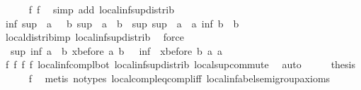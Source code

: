 \begin{isabellebody}
\ \ \ \ \isamarkupfalse%
\ f{}{}\ f{}{}\ \isamarkupfalse%
\ {\isacharparenleft}simp\ add{\isacharcolon}\ local{\isachardot}inf{\isacharunderscore}sup{\isacharunderscore}distrib{}{\isacharparenright}\isanewline
\ \ \isamarkupfalse%
\ {\isachardoublequoteopen}inf\ {\isacharparenleft}sup\ {\isacharparenleft}{\isacharminus}\ a{\isacharparenright}\ {\isacharparenleft}{\isacharminus}\ {\isacharparenleft}{\isacharminus}\ b{\isacharparenright}{\isacharparenright}{\isacharparenright}\ {\isacharparenleft}sup\ {\isacharparenleft}{\isacharminus}\ a{\isacharparenright}\ {\isacharparenleft}{\isacharminus}\ b{\isacharparenright}{\isacharparenright}\ {\isacharequal}\ sup\ {\isacharparenleft}sup\ {\isacharparenleft}{\isacharminus}\ a{\isacharparenright}\ {\isacharparenleft}{\isacharminus}\ a{\isacharparenright}{\isacharparenright}\ {\isacharparenleft}inf\ b\ {\isacharparenleft}{\isacharminus}\ b{\isacharparenright}{\isacharparenright}{\isachardoublequoteclose}\isanewline
\ \ \ \ \isamarkupfalse%
\ local{\isachardot}distrib{\isacharunderscore}imp{}\ local{\isachardot}inf{\isacharunderscore}sup{\isacharunderscore}distrib{}\ \isamarkupfalse%
\ force\isanewline
\ \ \isamarkupfalse%
\ \isamarkupfalse%
\ {\isachardoublequoteopen}{\isacharminus}\ sup\ {\isacharparenleft}inf\ a\ {\isacharparenleft}{\isacharminus}\ b{\isacharparenright}{\isacharparenright}\ {\isacharparenleft}xbefore\ a\ b{\isacharparenright}\ {\isacharequal}\ {\isacharminus}\ inf\ {\isacharparenleft}{\isacharminus}\ xbefore\ b\ a{\isacharparenright}\ a{\isachardoublequoteclose}\isanewline
\ \ \ \ \isamarkupfalse%
\ f{}{}\ f{}{}\ f{}{}\ f{}{}\ local{\isachardot}inf{\isacharunderscore}compl{\isacharunderscore}bot\ local{\isachardot}inf{\isacharunderscore}sup{\isacharunderscore}distrib{}\ local{\isachardot}sup{\isacharunderscore}commute\ \isamarkupfalse%
\ auto\isanewline
\ \ \isamarkupfalse%
\ \isamarkupfalse%
\ {\isacharquery}thesis\isanewline
\ \ \ \ \isamarkupfalse%
\ f{}{}\ \isamarkupfalse%
\ {\isacharparenleft}metis\ {\isacharparenleft}no{\isacharunderscore}types{\isacharparenright}\ local{\isachardot}compl{\isacharunderscore}eq{\isacharunderscore}compl{\isacharunderscore}iff\ local{\isachardot}inf{\isachardot}abel{\isacharunderscore}semigroup{\isacharunderscore}axioms{\isacharparenright}\isanewline
{}\isamarkupfalse%
%
\endisatagproof
{\isafoldproof}%
%
\isadelimproof
\isanewline
%
\endisadelimproof
\isanewline
\isanewline
\isanewline
{}\isamarkupfalse%
\isanewline
%
\isadelimtheory
%
\endisadelimtheory
%
\isatagtheory
%
\endisatagtheory
{\isafoldtheory}%
%
\isadelimtheory
%
\endisadelimtheory
%
\end{isabellebody}%
